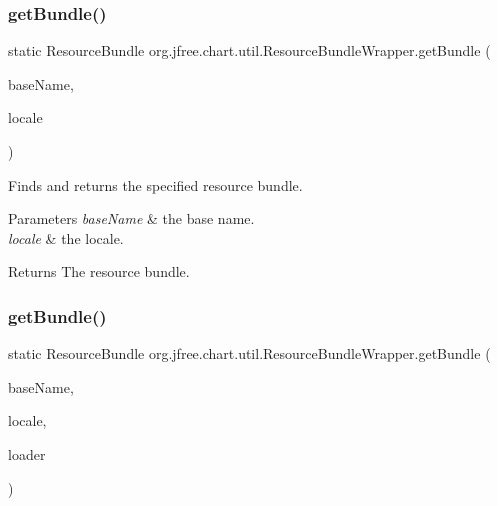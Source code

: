 \subsubsection{\texorpdfstring{get\+Bundle()}{getBundle()}\hspace{0.1cm}{\footnotesize\ttfamily [2/3]}}
{\footnotesize\ttfamily static Resource\+Bundle org.\+jfree.\+chart.\+util.\+Resource\+Bundle\+Wrapper.\+get\+Bundle (\begin{DoxyParamCaption}\item[{String}]{base\+Name,  }\item[{Locale}]{locale }\end{DoxyParamCaption})\hspace{0.3cm}{\ttfamily [static]}}

Finds and returns the specified resource bundle.


\begin{DoxyParams}{Parameters}
{\em base\+Name} & the base name. \\
\hline
{\em locale} & the locale.\\
\hline
\end{DoxyParams}
\begin{DoxyReturn}{Returns}
The resource bundle. 
\end{DoxyReturn}
\mbox{\label{classorg_1_1jfree_1_1chart_1_1util_1_1_resource_bundle_wrapper_ac315577a435d5b2cae81bec4b89d53bc}} 
\subsubsection{\texorpdfstring{get\+Bundle()}{getBundle()}\hspace{0.1cm}{\footnotesize\ttfamily [3/3]}}
{\footnotesize\ttfamily static Resource\+Bundle org.\+jfree.\+chart.\+util.\+Resource\+Bundle\+Wrapper.\+get\+Bundle (\begin{DoxyParamCaption}\item[{String}]{base\+Name,  }\item[{Locale}]{locale,  }\item[{Class\+Loader}]{loader }\end{DoxyParamCaption})\hspace{0.3cm}{\ttfamily [static]}}

